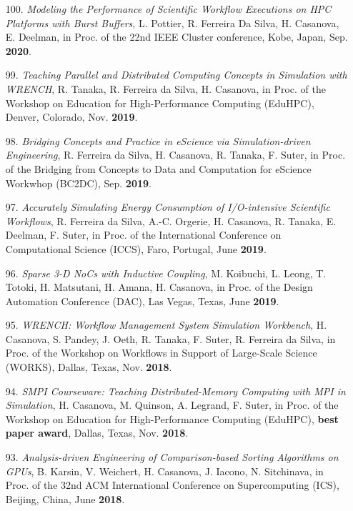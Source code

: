 \begin{enumerate}
\item [100.] {\it Modeling the Performance of Scientific Workflow Executions on HPC Platforms with Burst Buffers},
L. Pottier, R. Ferreira Da Silva, H. Casanova, E. Deelman,
in Proc. of the 22nd IEEE Cluster conference, Kobe, Japan, Sep. {\bf 2020}.

\item [99.] {\it Teaching Parallel and Distributed Computing Concepts in
Simulation with WRENCH}, R. Tanaka, R. Ferreira da Silva, H. Casanova, in
Proc. of the Workshop on Education for High-Performance Computing (EduHPC),
Denver, Colorado, Nov. {\bf 2019}.



\item [98.] {\it Bridging Concepts and Practice in eScience via
      Simulation-driven Engineering},
    R. Ferreira da Silva, H. Casanova, R. Tanaka, F. Suter,
	in Proc. of the Bridging from Concepts to Data and Computation for
	eScience Workwhop (BC2DC), Sep. {\bf 2019}.

\item [97.] {\it Accurately Simulating Energy Consumption of I/O-intensive Scientific Workflows}, R. Ferreira da Silva, A.-C. Orgerie, H. Casanova, R. Tanaka, E. Deelman, F. Suter, in Proc. of the International Conference on Computational Science (ICCS), Faro, Portugal, June {\bf 2019}.

\item [96.] {\it Sparse 3-D NoCs with Inductive Coupling}, M. Koibuchi, L. Leong, T. Totoki, H. Matsutani, H. Amana, H. Casanova, in Proc. of the Design Automation Conference (DAC), Las Vegas, Texas, June {\bf 2019}.

\item [95.] {\it WRENCH: Workflow Management System Simulation Workbench}, H. Casanova, S. Pandey, J. Oeth, R. Tanaka, F. Suter, R. Ferreira da Silva, in Proc. of the Workshop on Workflows in Support of Large-Scale Science (WORKS), Dallas, Texas, Nov. {\bf 2018}.

\item [94.] {\it SMPI Courseware: Teaching Distributed-Memory Computing with MPI in Simulation}, H. Casanova, M. Quinson, A. Legrand, F. Suter, in Proc. of the Workshop on Education for High-Performance Computing (EduHPC), {\bf best paper award}, Dallas, Texas, Nov. {\bf 2018}.

\item [93.] {\it Analysis-driven Engineering of Comparison-based Sorting
    Algorithms on GPUs},
    B. Karsin, V. Weichert, H. Casanova, J. Iacono, N. Sitchinava, 
in Proc. of the 32nd ACM International Conference on Supercomputing
(ICS), Beijing, China, June {\bf 2018}.


\end{enumerate}
